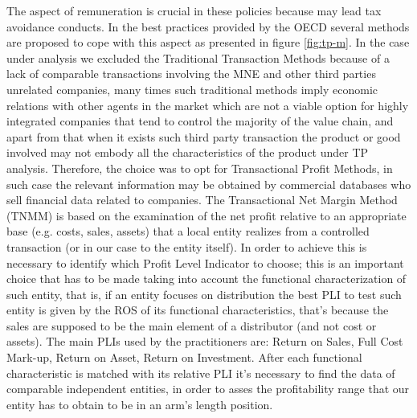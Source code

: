 \documentclass[conference,final,]{IEEEtran}
\begin{document}
The aspect of remuneration is crucial in these policies because may lead tax avoidance conducts. In the best practices provided by the OECD several methods are proposed to cope with this aspect as presented in figure \ref{fig:tp-m}. In the case under analysis we excluded the Traditional Transaction Methods because of a lack of comparable transactions involving the MNE and other third parties unrelated companies, many times such traditional methods imply economic relations with other agents in the market which are not a viable option for highly integrated companies that tend to control the majority of the value chain, and apart from that when it exists such third party transaction the product or good involved may not embody all the characteristics of the product under TP analysis. Therefore, the choice was to opt for Transactional Profit Methods, in such case the relevant information may be obtained by commercial databases who sell financial data related to companies. The Transactional Net Margin Method (TNMM) is based on the examination of the net profit relative to an appropriate base (e.g. costs, sales, assets) that a local entity realizes from a controlled transaction (or in our case to the entity itself). In order to achieve this is necessary to identify which Profit Level Indicator to choose; this is an important choice that has to be made taking into account the functional characterization of such entity, that is, if an entity focuses on distribution the best PLI to test such entity is given by the ROS of its functional characteristics, that's because the sales are supposed to be the main element of a distributor (and not cost or assets). The main PLIs used by the practitioners are: Return on Sales, Full Cost Mark-up, Return on Asset, Return on Investment. After each functional characteristic is matched with its relative PLI it's necessary to find the data of comparable independent entities, in order to asses the profitability range that our entity has to obtain to be in an arm's length position.
\end{document}
